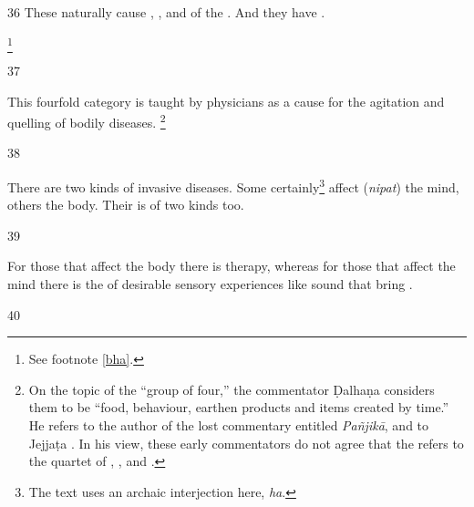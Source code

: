 \begin{translation}
    
    \item[36]  These naturally cause 
    , 
    , 
    and 
     of the . And they have
    .
    
    \footnote{See footnote \ref{bha}.}
    
    \item[37] 
    \begin{sloka}
        This fourfold category is taught by physicians as a cause for the agitation and 
        quelling of bodily diseases.%
        \footnote{On the topic of the “group of four,” the commentator Ḍalhaṇa
        considers them to be “food, behaviour, earthen products and items created by
        time.”  He refers to the author of the lost commentary entitled \emph{Pañjikā},
        and to Jejjaṭa \citep[IA, 372--3, 192]{meul-hist}.  In his view, these early
        commentators  do not agree that the  refers
        to the quartet of , ,
         and  \citep[9a]{vulgate}.}
    \end{sloka}
    
    \item[38] \begin{sloka}
        There are two kinds of invasive diseases. Some certainly\footnote{The
        text uses an archaic interjection here, \emph{ha}.} 
        affect (\emph{ni\root pat}) 
        the
        mind, others the body. Their  is of two kinds too.
    \end{sloka}
    
    \item[39]\begin{sloka}
        For those that affect the body there is  
        therapy, whereas for those that affect the mind there is the 
         of desirable sensory experiences like sound that 
        bring .
        
    \end{sloka}
    
    \item [40] 
    

\end{translation}

